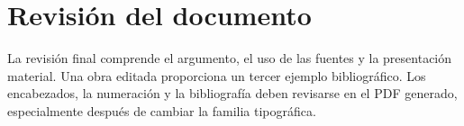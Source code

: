 \section{Revisión del documento}
La revisión final comprende el argumento, el uso de las fuentes y la presentación material.
Una obra editada proporciona un tercer ejemplo bibliográfico.\autocite[432]{tuggy1996}
Los encabezados, la numeración y la bibliografía deben revisarse en el PDF generado, especialmente después de cambiar la familia tipográfica.
